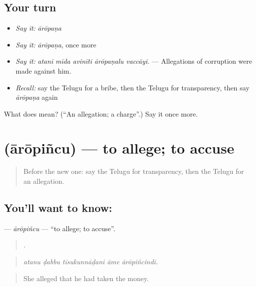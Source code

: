 \subsection*{Your turn}
\begin{itemize}
\raggedright
  \item \emph{Say it:} \emph{ārōpaṇa}
  \item \emph{Say it:} \emph{ārōpaṇa}, once more
  \item \emph{Say it:} \emph{atani mīda avinīti ārōpaṇalu vaccāyi.} — Allegations of corruption were made against him.
  \item \emph{Recall:} say the Telugu for a bribe, then the Telugu for transparency, then say \emph{ārōpaṇa} again
\end{itemize}

\begin{tcolorbox}[breakable,colback=teal!4,colframe=teal!35!black,title={Before you move on}]
What does  mean? (\textquotedblleft{}An allegation; a charge\textquotedblright{}.) Say it once more.
\end{tcolorbox}
\section[\texorpdfstring{\te{ఆరోపించు} (ārōpiñcu)}{ఆరోపించు (ārōpiñcu)}]{ (ārōpiñcu) — to allege; to accuse}

\label{lesson:TE-C406-aropincu}



\begin{quote}
Before the new one: say the Telugu for transparency, then the Telugu for an allegation.
\end{quote}

\subsection*{You'll want to know: }
\textbf{} — \emph{ārōpiñcu} — \textquotedblleft{}to allege; to accuse\textquotedblright{}.

\begin{quote}
    .
\end{quote}

\begin{quote}
\emph{atanu ḍabbu tīsukunnāḍani āme ārōpiñcindi.}
\end{quote}

\begin{quote}
She alleged that he had taken the money.
\end{quote}

